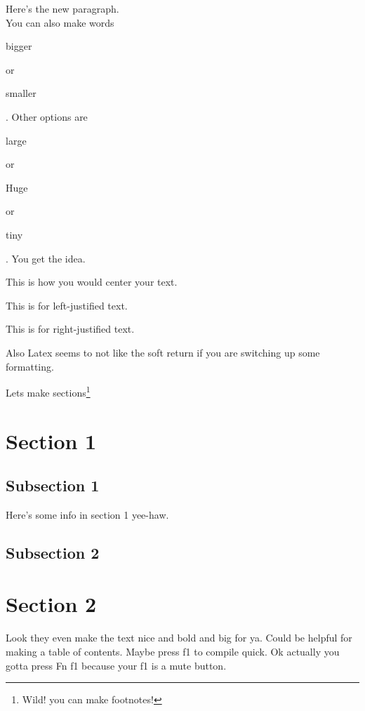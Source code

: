 \documentclass[11pt]{article}
\begin{document}
Here's the new paragraph.\\
You can also make words \begin{Large} bigger \end{Large} or \begin{small} smaller \end{small}. Other options are \begin{large} large \end{large} or \begin{Huge} Huge \end{Huge} or \begin{tiny} tiny \end{tiny}. You get the idea.

\begin{center} This is how you would center your text. \end{center}

\begin{flushleft}This is for left-justified text.\end{flushleft}

\begin{flushright} This is for right-justified text.\end{flushright}

Also Latex seems to not like the soft return if you are switching up some formatting. 

Lets make sections\footnote{Wild! you can make footnotes!}

\section{Section 1}
\subsection{Subsection 1}
Here's some info in section 1 yee-haw.
\subsection{Subsection 2}
\section{Section 2}

Look they even make the text nice and bold and big for ya.  Could be helpful for making a table of contents. Maybe press f1 to compile quick. Ok actually you gotta press Fn f1 because your f1 is a mute button. 
\end{document}
